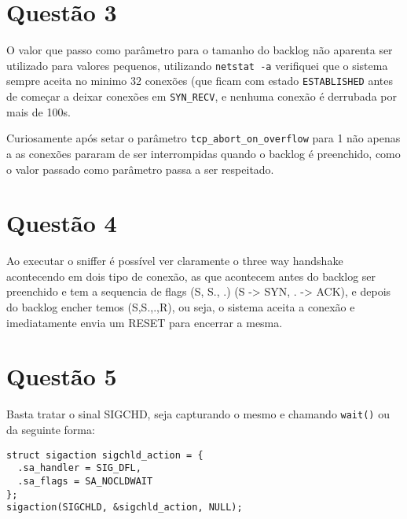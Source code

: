 \documentclass[11pt]{article}
\begin{document}
\section{Questão 3}
\label{sec:orgheadline3}
O valor que passo como parâmetro para o tamanho do backlog não aparenta ser
utilizado para valores pequenos, utilizando \texttt{netstat -a} verifiquei que o
sistema sempre aceita no minimo 32 conexões (que ficam com estado \texttt{ESTABLISHED}
antes de começar a deixar conexões em \texttt{SYN\_RECV}, e nenhuma conexão é derrubada
por mais de 100s. 

Curiosamente após setar o parâmetro \texttt{tcp\_abort\_on\_overflow} para 1 não apenas a
as conexões pararam de ser interrompidas quando o backlog é preenchido, como o
valor passado como parâmetro passa a ser respeitado.

\section{Questão 4}
\label{sec:orgheadline4}
Ao executar o sniffer é possível ver claramente o three way handshake
acontecendo em dois tipo de conexão, as que acontecem antes do backlog ser
preenchido e tem a sequencia de flags (S, S., .) (S -> SYN, . -> ACK), e depois
do backlog encher temos (S,S.,.,R), ou seja, o sistema aceita a conexão e
imediatamente envia um RESET para encerrar a mesma.

\section{Questão 5}
\label{sec:orgheadline5}
Basta tratar o sinal SIGCHD, seja capturando o mesmo e chamando \texttt{wait()} ou da
seguinte forma:

\begin{verbatim}
struct sigaction sigchld_action = {
  .sa_handler = SIG_DFL,
  .sa_flags = SA_NOCLDWAIT
};
sigaction(SIGCHLD, &sigchld_action, NULL);
\end{verbatim}
\end{document}
